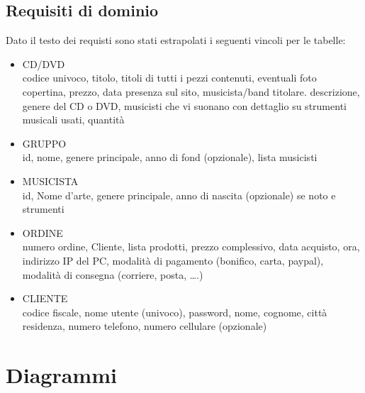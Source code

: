 \documentclass[a4paper,titlepage]{book}
\begin{document}
\section{Requisiti di dominio}
Dato il testo dei requisti sono stati estrapolati i seguenti vincoli per le tabelle:
\begin{itemize}
\item CD/DVD \\
codice univoco, titolo, titoli di tutti i pezzi contenuti, eventuali foto copertina, prezzo, data presenza sul sito, musicista/band titolare. descrizione, genere del CD o DVD, musicisti che vi suonano con dettaglio su strumenti musicali usati, quantit\`a

\item GRUPPO \\
id, nome, genere principale, anno di fond (opzionale), lista musicisti

\item MUSICISTA \\
id, Nome d’arte, genere principale, anno di nascita (opzionale) se noto e strumenti

\item ORDINE \\
numero ordine, Cliente, lista prodotti, prezzo complessivo, data acquisto, ora, indirizzo IP del PC, modalit\`a di pagamento (bonifico, carta, paypal), modalit\`a di consegna (corriere, posta, ….)

\item CLIENTE \\
codice fiscale, nome utente (univoco), password, nome, cognome, città residenza, numero telefono, numero cellulare (opzionale)
\end{itemize}

\chapter{Diagrammi}
\end{document}
